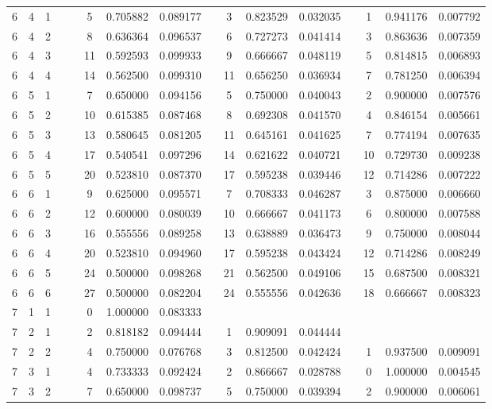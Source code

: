 \begin{appendix}
\begin{longtable}[h]{rrrccccccccccccc}
6	&	4	&	1	&&&	5	&	0.705882	&	0.089177	&&	3	&	0.823529	&	0.032035	&&	1	&	0.941176	&	0.007792	\\
6	&	4	&	2	&&&	8	&	0.636364	&	0.096537	&&	6	&	0.727273	&	0.041414	&&	3	&	0.863636	&	0.007359	\\
6	&	4	&	3	&&&	11	&	0.592593	&	0.099933	&&	9	&	0.666667	&	0.048119	&&	5	&	0.814815	&	0.006893	\\
6	&	4	&	4	&&&	14	&	0.562500	&	0.099310	&&	11	&	0.656250	&	0.036934	&&	7	&	0.781250	&	0.006394	\\
6	&	5	&	1	&&&	7	&	0.650000	&	0.094156	&&	5	&	0.750000	&	0.040043	&&	2	&	0.900000	&	0.007576	\\
6	&	5	&	2	&&&	10	&	0.615385	&	0.087468	&&	8	&	0.692308	&	0.041570	&&	4	&	0.846154	&	0.005661	\\
6	&	5	&	3	&&&	13	&	0.580645	&	0.081205	&&	11	&	0.645161	&	0.041625	&&	7	&	0.774194	&	0.007635	\\
6	&	5	&	4	&&&	17	&	0.540541	&	0.097296	&&	14	&	0.621622	&	0.040721	&&	10	&	0.729730	&	0.009238	\\
6	&	5	&	5	&&&	20	&	0.523810	&	0.087370	&&	17	&	0.595238	&	0.039446	&&	12	&	0.714286	&	0.007222	\\
6	&	6	&	1	&&&	9	&	0.625000	&	0.095571	&&	7	&	0.708333	&	0.046287	&&	3	&	0.875000	&	0.006660	\\
6	&	6	&	2	&&&	12	&	0.600000	&	0.080039	&&	10	&	0.666667	&	0.041173	&&	6	&	0.800000	&	0.007588	\\
6	&	6	&	3	&&&	16	&	0.555556	&	0.089258	&&	13	&	0.638889	&	0.036473	&&	9	&	0.750000	&	0.008044	\\
6	&	6	&	4	&&&	20	&	0.523810	&	0.094960	&&	17	&	0.595238	&	0.043424	&&	12	&	0.714286	&	0.008249	\\
6	&	6	&	5	&&&	24	&	0.500000	&	0.098268	&&	21	&	0.562500	&	0.049106	&&	15	&	0.687500	&	0.008321	\\
6	&	6	&	6	&&&	27	&	0.500000	&	0.082204	&&	24	&	0.555556	&	0.042636	&&	18	&	0.666667	&	0.008323	\\
7	&	1	&	1	&&&	0	&	1.000000	&	0.083333	&&		&		&		&&		&		&		\\
7	&	2	&	1	&&&	2	&	0.818182	&	0.094444	&&	1	&	0.909091	&	0.044444	&&		&		&		\\
7	&	2	&	2	&&&	4	&	0.750000	&	0.076768	&&	3	&	0.812500	&	0.042424	&&	1	&	0.937500	&	0.009091	\\
7	&	3	&	1	&&&	4	&	0.733333	&	0.092424	&&	2	&	0.866667	&	0.028788	&&	0	&	1.000000	&	0.004545	\\
7	&	3	&	2	&&&	7	&	0.650000	&	0.098737	&&	5	&	0.750000	&	0.039394	&&	2	&	0.900000	&	0.006061	\\

\end{longtable}
\end{appendix}
